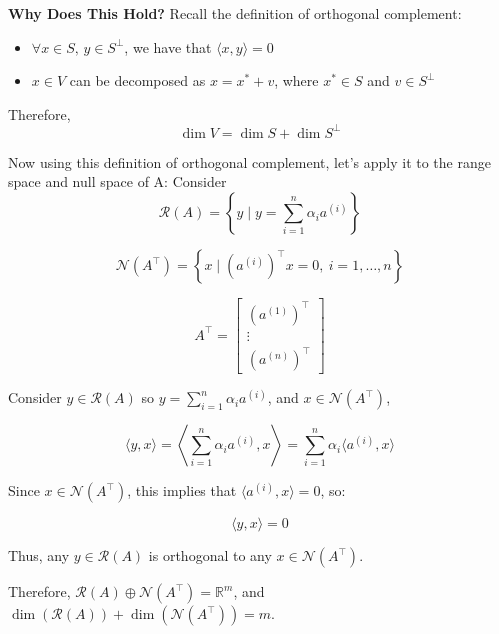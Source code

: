 \begin{derivation}
    \textbf{Why Does This Hold?} Recall the definition of orthogonal complement:

    \begin{itemize}
        \item $\forall x \in S, \, y \in S^\perp$, we have that $\langle x, y \rangle = 0$
        \item $x \in V$ can be decomposed as $x = x^* + v$, where $x^* \in S$ and $v \in S^\perp$
    \end{itemize}

    Therefore, 
    \begin{equation*}
        \dim V = \dim S + \dim S^\perp
    \end{equation*}
    \vspace{1em}

    Now using this definition of orthogonal complement, let's apply it to the range space and null space of A:
    Consider 
    \begin{equation*}
        \mathcal{R}(A) = \left\{ y \mid y = \sum_{i=1}^{n} \alpha_i a^{(i)} \right\}
    \end{equation*}

    \begin{equation*}
        \mathcal{N}(A^\top) = \left\{ x \mid \left(a^{(i)}\right)^\top x = 0, \ i = 1, \ldots, n \right\}
    \end{equation*}

    \[
    A^\top = \begin{bmatrix}
    (a^{(1)})^\top \\
    \vdots \\
    (a^{(n)})^\top
    \end{bmatrix}
    \]

    Consider $y \in \mathcal{R}(A)$ so $y = \sum_{i=1}^{n} \alpha_i a^{(i)}$, and $x \in \mathcal{N}(A^\top)$,

    \[
    \langle y, x \rangle = \left\langle \sum_{i=1}^{n} \alpha_i a^{(i)}, x \right\rangle = \sum_{i=1}^{n} \alpha_i \langle a^{(i)}, x \rangle
    \]

    Since $x \in \mathcal{N}(A^\top)$, this implies that $\langle a^{(i)}, x \rangle = 0$, so:

    \[
    \langle y, x \rangle = 0
    \]

    Thus, any $y \in \mathcal{R}(A)$ is orthogonal to any $x \in \mathcal{N}(A^\top)$.
    \vspace{1em}

    Therefore, $\mathcal{R}(A) \oplus \mathcal{N}(A^\top) = \mathbb{R}^m$, and $\dim(\mathcal{R}(A)) + \dim(\mathcal{N}(A^\top)) = m$.

\end{derivation}

